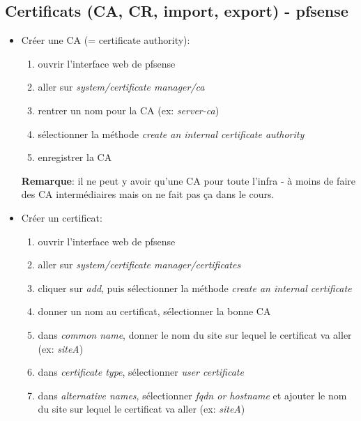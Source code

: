 \documentclass[a4paper]{article}
\begin{document}
\subsection{Certificats (CA, CR, import, export) - pfsense} \label{subsec:certificatsPfsense}





\begin{itemize}


\item Créer une CA (= certificate authority):
\begin{enumerate}
    \item ouvrir l'interface web de pfsense
    \item aller sur \textit{system/certificate manager/ca}
    \item rentrer un nom pour la CA (ex: \textit{server-ca})
    \item sélectionner la méthode \textit{create an internal certificate authority}
    \item enregistrer la CA
\end{enumerate}
\textbf{Remarque}: il ne peut y avoir qu'une CA pour toute l'infra - à moins de faire des CA intermédiaires mais on ne fait pas ça dans le cours.


\item Créer un certificat:
\begin{enumerate}
    \item ouvrir l'interface web de pfsense
    \item aller sur \textit{system/certificate manager/certificates}
    \item cliquer sur \textit{add}, puis sélectionner la méthode \textit{create an internal certificate}
    \item donner un nom au certificat, sélectionner la bonne CA
    \item dans \textit{common name}, donner le nom du site sur lequel le certificat va aller (ex: \textit{siteA})
    \item dans \textit{certificate type}, sélectionner \textit{user certificate}
    \item dans \textit{alternative names}, sélectionner \textit{fqdn or hostname} et ajouter le nom du site sur lequel le certificat va aller (ex: \textit{siteA})
\end{enumerate}



\end{itemize}
\end{document}
